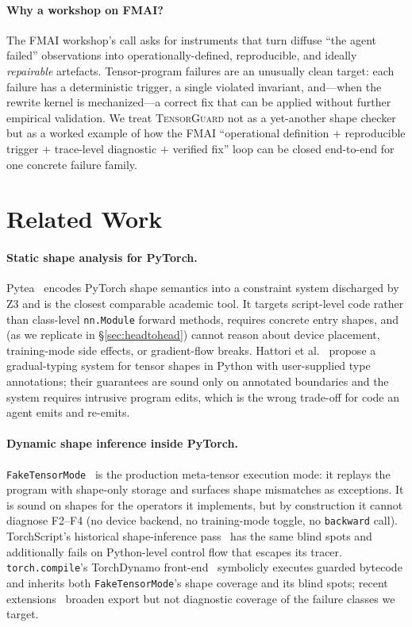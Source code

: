 \documentclass{article}
\begin{document}
\paragraph{Why a workshop on FMAI?}
The FMAI workshop's call asks for instruments that turn diffuse
``the agent failed'' observations into
operationally-defined, reproducible, and ideally \emph{repairable}
artefacts. Tensor-program failures are an unusually clean
target: each failure has a deterministic trigger, a single
violated invariant, and---when the rewrite kernel is mechanized---a
correct fix that can be applied without further empirical
validation. We treat \textsc{TensorGuard} not as a yet-another
shape checker but as a worked example of how the FMAI
``operational definition $+$ reproducible trigger $+$
trace-level diagnostic $+$ verified fix'' loop can be closed
end-to-end for one concrete failure family.

\section{Related Work}
\label{sec:related}

\paragraph{Static shape analysis for PyTorch.}
Pytea~\citep{pytea} encodes PyTorch shape semantics into a
constraint system discharged by Z3 and is the closest comparable
academic tool. It targets script-level code rather than class-level
\texttt{nn.Module} forward methods, requires concrete entry
shapes, and (as we replicate in \S\ref{sec:headtohead}) cannot
reason about device placement, training-mode side effects, or
gradient-flow breaks. Hattori et al.\ \citep{hattori} propose a
gradual-typing system for tensor shapes in Python with
user-supplied type annotations; their guarantees are sound only
on annotated boundaries and the system requires intrusive
program edits, which is the wrong
trade-off for code an agent emits and re-emits.

\paragraph{Dynamic shape inference inside PyTorch.}
\texttt{FakeTensorMode}~\citep{faketensor} is the production
meta-tensor execution mode: it replays the program with shape-only
storage and surfaces shape mismatches as exceptions. It is
sound on shapes for the operators it implements, but by
construction it cannot diagnose F2--F4 (no device backend, no
training-mode toggle, no \texttt{backward} call). TorchScript's
historical shape-inference pass~\citep{torchscript} has the
same blind spots and additionally fails on Python-level control
flow that escapes its tracer. \texttt{torch.compile}'s
TorchDynamo front-end~\citep{torchcompile} symbolicly executes
guarded bytecode and inherits both \texttt{FakeTensorMode}'s
shape coverage and its blind spots; recent
extensions~\citep{dynamoexport} broaden export but not
diagnostic coverage of the failure classes we target.
\end{document}

